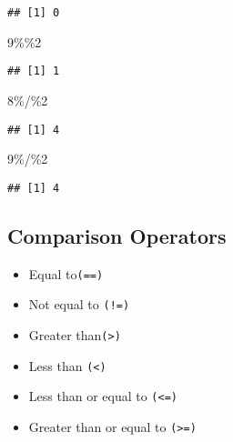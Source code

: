 \documentclass[
]{article}
\newenvironment{Shaded}{\begin{snugshade}}{\end{snugshade}}
\newcommand{\DecValTok}[1]{\textcolor[rgb]{0.00,0.00,0.81}{#1}}
\newcommand{\SpecialCharTok}[1]{\textcolor[rgb]{0.00,0.00,0.00}{#1}}
\providecommand{\tightlist}{%
  \setlength{\itemsep}{0pt}\setlength{\parskip}{0pt}}
\begin{document}
\begin{verbatim}
## [1] 0
\end{verbatim}

\begin{Shaded}
\begin{Highlighting}[]
\DecValTok{9}\SpecialCharTok{\%\%}\DecValTok{2}
\end{Highlighting}
\end{Shaded}

\begin{verbatim}
## [1] 1
\end{verbatim}

\begin{Shaded}
\begin{Highlighting}[]
\DecValTok{8}\SpecialCharTok{\%/\%}\DecValTok{2}
\end{Highlighting}
\end{Shaded}

\begin{verbatim}
## [1] 4
\end{verbatim}

\begin{Shaded}
\begin{Highlighting}[]
\DecValTok{9}\SpecialCharTok{\%/\%}\DecValTok{2}
\end{Highlighting}
\end{Shaded}

\begin{verbatim}
## [1] 4
\end{verbatim}

\hypertarget{comparison-operators}{%
\subsection{Comparison Operators}\label{comparison-operators}}

\begin{itemize}
\tightlist
\item
  Equal to\texttt{(==)}\\
\item
  Not equal to \texttt{(!=)}\\
\item
  Greater than\texttt{(\textgreater{})}\\
\item
  Less than \texttt{(\textless{})}\\
\item
  Less than or equal to \texttt{(\textless{}=)}\\
\item
  Greater than or equal to \texttt{(\textgreater{}=)}
\end{itemize}
\end{document}
